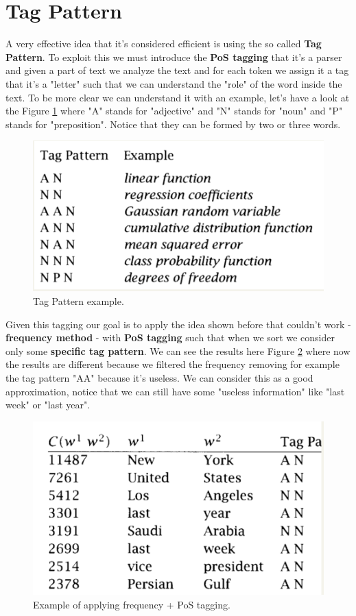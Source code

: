 \section{Tag Pattern}
A very effective idea that it's considered efficient is using the so called \textbf{Tag Pattern}. To exploit this we must introduce the \textbf{PoS tagging} that it's a parser and given a part of text we analyze the text and for each token we assign it a tag that it's a "letter" such that we can understand the "role" of the word inside the text. To be more clear we can understand it with an example, let's have a look at the Figure \ref{fig:tagpatternexample} where "A" stands for "adjective" and "N" stands for "noun" and "P" stands for "preposition". Notice that they can be formed by two or three words.\newline
\begin{figure}
    \centering
    \includegraphics[width=0.75\linewidth]{images/tagpatternexample.png}
    \caption{Tag Pattern example.}
    \label{fig:tagpatternexample}
\end{figure}
Given this tagging our goal is to apply the idea shown before that couldn't work - \textbf{frequency method} - with \textbf{PoS tagging} such that when we sort we consider only some \textbf{specific tag pattern}.\newline
We can see the results here Figure \ref{fig:frequencypostagging} where now the results are different because we filtered the frequency removing for example the tag pattern "AA" because it's useless. We can consider this as a good approximation, notice that we can still have some "useless information" like "last week" or "last year".\newline
\begin{figure}
    \centering
    \includegraphics[width=0.75\linewidth]{images/tagexample.png}
    \caption{Example of applying frequency + PoS tagging.}
    \label{fig:frequencypostagging}
\end{figure}
